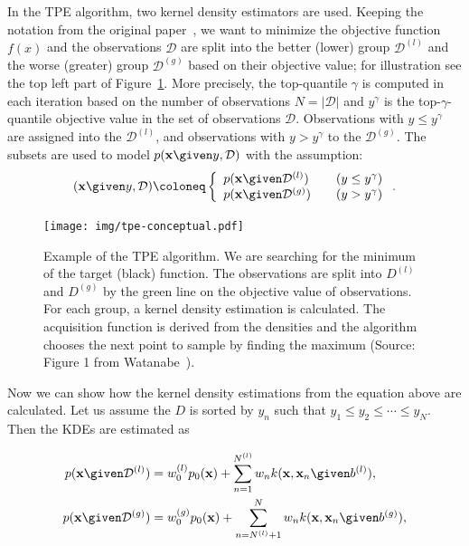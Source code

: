 In the TPE algorithm, two kernel density estimators are used. Keeping the notation from the original paper~\cite{bergstra2011algorithms}, we want to minimize the objective function $f(x)$ and the observations $\mathcal{D}$ are split into the better (lower) group $\mathcal{D}^{(l)}$ and the worse (greater) group $\mathcal{D}^{(g)}$ based on their objective value; for illustration see the top left part of Figure~\ref{fig:tpe}. More precisely, the top-quantile $\gamma$ is computed in each iteration based on the number of observations $N=|\mathcal{D}|$ and $y^{\gamma}$ is the top-$\gamma$-quantile objective value in the set of observations $\mathcal{D}$. Observations with $y\leq y^\gamma$ are assigned into the $\mathcal{D}^{(l)}$, and observations with $y > y^\gamma$ to the $\mathcal{D}^{(g)}$. The subsets are used to model $p(\mathbf{x} \given y, \mathcal{D})$ with the assumption:
\begin{equation} (\mathbf{x} \given y, \mathcal{D})\coloneq  \left\{
  \begin{array}{ll}
        p(\mathbf{x} \given \mathcal{D}^{(l)}) \quad  &(y \leq y^\gamma) \\
        p(\mathbf{x} \given \mathcal{D}^{(g)}) \quad  &(y > y^\gamma)
  \end{array}
  \right. .
  \label{eqn:tpe:assumption}
\end{equation}

\begin{figure}
    \centering
    \texttt{[image: img/tpe-conceptual.pdf]}
    \caption{Example of the TPE algorithm. We are searching for the minimum of the target (black) function. The observations are split into $D^{(l)}$ and $D^{(g)}$ by the green line on the objective value of observations. For each group, a kernel density estimation is calculated. The acquisition function is derived from the densities and the algorithm chooses the next point to sample by finding the maximum (Source: Figure 1 from Watanabe~\cite{watanabe2023tree}).}
    \label{fig:tpe}
\end{figure}

Now we can show how the kernel density estimations from the equation above are calculated. Let us assume the $D$ is sorted by $y_n$ such that $y_1 \leq y_2 \leq \cdots \leq y_N$. Then the KDEs are estimated as


\begin{equation}
    \begin{split}
   p(\mathbf{x} \given \mathcal{D}^{(l)}) &= w_0^{(l)} p_0(\mathbf{x}) + \sum_{n=1}^{N^{(l)}}w_n k(\mathbf{x},\mathbf{x}_n \given b^{(l)}), \\
   p(\mathbf{x} \given \mathcal{D}^{(g)}) &= w_0^{(g)} p_0(\mathbf{x}) + \sum_{n=N^{(l)}+1}^{N}w_n k(\mathbf{x},\mathbf{x}_n \given b^{(g)}),
    \end{split}
    \label{eqn:tpe:kdes}
\end{equation}

